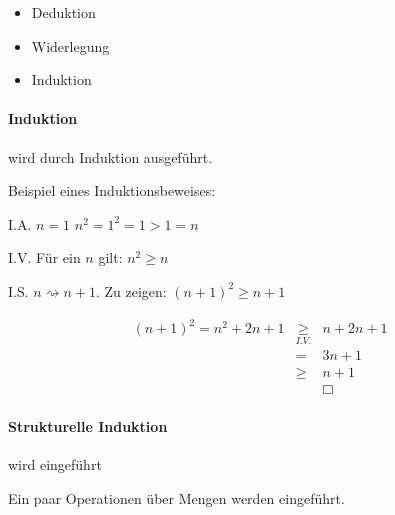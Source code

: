 \documentclass[a4paper,12pt]{article}
\begin{document}
\begin{itemize}
    \item Deduktion
    \item Widerlegung
    \item Induktion
\end{itemize}

\paragraph{Induktion} wird durch Induktion ausgeführt.\

\newpage

Beispiel eines Induktionsbeweises:

I.A. $n=1$ $n^2=1^2=1>1=n$

I.V. Für ein $n$ gilt: $n^2\ge n$

I.S. $n\rightsquigarrow n+1$. Zu zeigen: $(n+1)^2\ge n+1$

$$\begin{aligned}
        (n+1)^2=n^2+2n+1 & \underset{I.V.}{\ge} & n+2n+1 \\
                         & =                    & 3n+1   \\
                         & \ge                  & n+1    \\
                         & \quad                & \Box
    \end{aligned}$$

\paragraph{Strukturelle Induktion} wird eingeführt

Ein paar Operationen über Mengen werden eingeführt.
\end{document}
